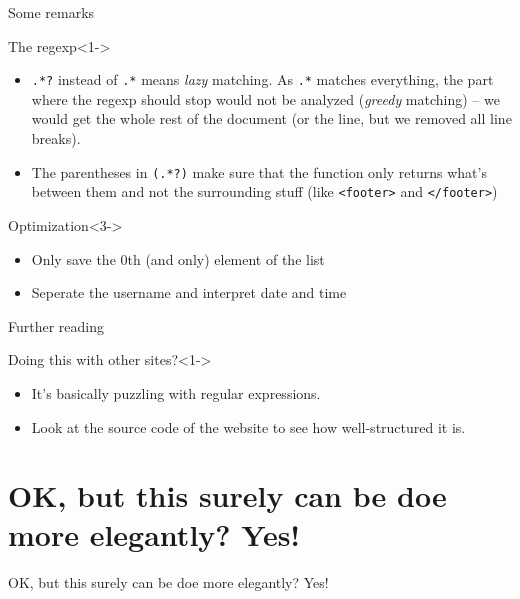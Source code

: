 \documentclass{beamer}
\begin{document}
\begin{frame}{Some remarks}
\begin{block}{The regexp}<1->
\begin{itemize}
\item {\tt{.*?}} instead of {\tt{.*}} means \emph{lazy} matching. As  {\tt{.*}} matches everything, the part where the regexp should stop would not be analyzed (\emph{greedy} matching) -- we would get the whole rest of the document (or the line, but we removed all line breaks).
\item<2->The parentheses in {\tt{(.*?)}} make sure that the function only returns what's between them and not the surrounding stuff (like {\tt{<footer>}} and {\tt{</footer>}})
\end{itemize}
\end{block}
\begin{block}{Optimization}<3->
\begin{itemize}
\item Only save the 0th (and only) element of the list
\item Seperate the username and interpret date and time
\end{itemize}
\end{block}

\end{frame}



\begin{frame}{Further reading}

\begin{block}{Doing this with other sites?}<1->
\begin{itemize}
\item It's basically puzzling with regular expressions. 
\item Look at the source code of the website to see how well-structured it is.
\end{itemize}
\end{block}

\end{frame}



\section{OK, but this surely can be doe more elegantly? Yes!}
\begin{frame}
OK, but this surely can be doe more elegantly? Yes!
\end{frame}
\end{document}
